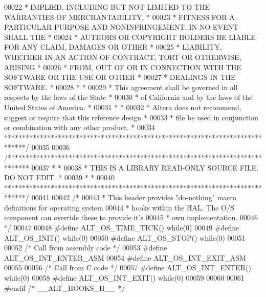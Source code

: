 \begin{DoxyCode}
00022 \textcolor{comment}{* IMPLIED, INCLUDING BUT NOT LIMITED TO THE WARRANTIES OF MERCHANTABILITY,    *}
00023 \textcolor{comment}{* FITNESS FOR A PARTICULAR PURPOSE AND NONINFRINGEMENT. IN NO EVENT SHALL THE *}
00024 \textcolor{comment}{* AUTHORS OR COPYRIGHT HOLDERS BE LIABLE FOR ANY CLAIM, DAMAGES OR OTHER      *}
00025 \textcolor{comment}{* LIABILITY, WHETHER IN AN ACTION OF CONTRACT, TORT OR OTHERWISE, ARISING     *}
00026 \textcolor{comment}{* FROM, OUT OF OR IN CONNECTION WITH THE SOFTWARE OR THE USE OR OTHER         *}
00027 \textcolor{comment}{* DEALINGS IN THE SOFTWARE.                                                   *}
00028 \textcolor{comment}{*                                                                             *}
00029 \textcolor{comment}{* This agreement shall be governed in all respects by the laws of the State   *}
00030 \textcolor{comment}{* of California and by the laws of the United States of America.              *}
00031 \textcolor{comment}{*                                                                             *}
00032 \textcolor{comment}{* Altera does not recommend, suggest or require that this reference design    *}
00033 \textcolor{comment}{* file be used in conjunction or combination with any other product.          *}
00034 \textcolor{comment}{******************************************************************************/}
00035 
00036 \textcolor{comment}{/******************************************************************************}
00037 \textcolor{comment}{*                                                                             *}
00038 \textcolor{comment}{* THIS IS A LIBRARY READ-ONLY SOURCE FILE. DO NOT EDIT.                       *}
00039 \textcolor{comment}{*                                                                             *}
00040 \textcolor{comment}{******************************************************************************/}
00041 
00042 \textcolor{comment}{/*}
00043 \textcolor{comment}{ * This header provides "do-nothing" macro definitions for operating system }
00044 \textcolor{comment}{ * hooks within the HAL. The O/S component can override these to provide it's }
00045 \textcolor{comment}{ * own implementation.}
00046 \textcolor{comment}{ */} 
00047 
00048 \textcolor{preprocessor}{#define ALT\_OS\_TIME\_TICK() while(0)}
00049 \textcolor{preprocessor}{#define ALT\_OS\_INIT()      while(0)}
00050 \textcolor{preprocessor}{#define ALT\_OS\_STOP()      while(0)}
00051 
00052 \textcolor{comment}{/* Call from assembly code */}
00053 \textcolor{preprocessor}{#define ALT\_OS\_INT\_ENTER\_ASM}
00054 \textcolor{preprocessor}{#define ALT\_OS\_INT\_EXIT\_ASM}
00055 
00056 \textcolor{comment}{/* Call from C code */}
00057 \textcolor{preprocessor}{#define ALT\_OS\_INT\_ENTER() while(0)}
00058 \textcolor{preprocessor}{#define ALT\_OS\_INT\_EXIT()  while(0)}
00059 
00060 
00061 \textcolor{preprocessor}{#endif }\textcolor{comment}{/* \_\_ALT\_HOOKS\_H\_\_ */}\textcolor{preprocessor}{}
\end{DoxyCode}
